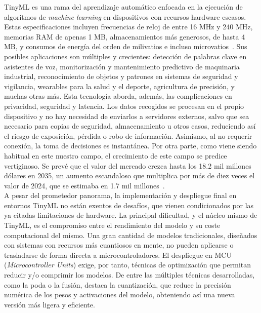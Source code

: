 \documentclass[a4paper,12pt,twoside,final]{book}
\begin{document}
TinyML es una rama del aprendizaje automático enfocada en la ejecución de algoritmos de
\textit{machine learning} en dispositivos con recursos hardware escasos. Estas especificaciones incluyen
frecuencias de reloj de entre 16 MHz y 240 MHz, memorias RAM de apenas 1 MB, almacenamientos más generosos,
de hasta 4 MB, y consumos de energía del orden de milivatios e incluso microvatios~\cite{ray2022kingsaud}.
Sus posibles aplicaciones son múltiples y crecientes: detección de palabras clave en asistentes de voz,
monitorización y mantenimiento predictivo de maquinaria industrial, reconocimiento de objetos y patrones en
sistemas de seguridad y vigilancia, wearables para la salud y el deporte, agricultura de precisión, y muchas
otras más. Esta tecnología aborda, además, las complicaciones en privacidad, seguridad y latencia. Los datos
recogidos se procesan en el propio dispositivo y no hay necesidad de enviarlos a servidores externos, salvo que
sea necesario para copias de seguridad, almacenamiento u otros casos, reduciendo así el riesgo de exposición,
pérdida o robo de información. Asimismo, al no requerir conexión, la toma de decisiones es instantánea. Por otra
parte, como viene siendo habitual en este nuestro campo, el crecimiento de este campo se predice vertiginoso. Se
prevé que el valor del mercado crezca hasta los 18.2 mil millones dólares en 2035, un aumento escandaloso que
multiplica por más de diez veces el valor de 2024, que se estimaba en 1.7 mil millones~\cite{faiyaz2026nmsc}.\\

A pesar del prometedor panorama, la implementación y despliegue final en entornos TinyML no están
exentos de desafíos, que vienen condicionados por las ya citadas limitaciones de hardware. La principal
dificultad, y el núcleo mismo de TinyML, es el compromiso entre el rendimiento del modelo y su coste
computacional del mismo. Una gran cantidad de modelos tradicionales, diseñados con sistemas con recursos más
cuantiosos en mente, no pueden aplicarse o trasladarse de forma directa a microcontroladores. El despliegue en
MCU (\textit{Microcontroller Units}) exige, por tanto, técnicas de optimización que permitan reducir
y/o comprimir los modelos. De entre las múltiples técnicas desarrolladas, como la poda o la fusión, destaca la
cuantización, que reduce la precisión numérica de los pesos y activaciones del modelo, obteniendo así una nueva
versión más ligera y eficiente.\\
\end{document}
